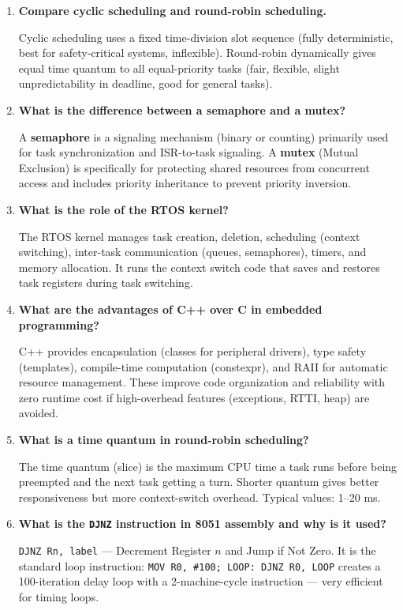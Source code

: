 \documentclass[12pt,a4paper]{article}
\newcommand{\Q}[1]{\textbf{#1}\par\noindent\ignorespaces}
\begin{document}
\begin{tcolorbox}[exambox, title={\textbf{Frequently Asked / Viva Questions}}]
\begin{enumerate}[topsep=0pt, label=\textbf{Q\arabic*.}, itemsep=5pt]
  \item \Q{Compare cyclic scheduling and round-robin scheduling.}
    Cyclic scheduling uses a fixed time-division slot sequence (fully deterministic, best for safety-critical systems, inflexible). Round-robin dynamically gives equal time quantum to all equal-priority tasks (fair, flexible, slight unpredictability in deadline, good for general tasks).
  \item \Q{What is the difference between a semaphore and a mutex?}
    A \textbf{semaphore} is a signaling mechanism (binary or counting) primarily used for task synchronization and ISR-to-task signaling. A \textbf{mutex} (Mutual Exclusion) is specifically for protecting shared resources from concurrent access and includes priority inheritance to prevent priority inversion.
  \item \Q{What is the role of the RTOS kernel?}
    The RTOS kernel manages task creation, deletion, scheduling (context switching), inter-task communication (queues, semaphores), timers, and memory allocation. It runs the context switch code that saves and restores task registers during task switching.
  \item \Q{What are the advantages of C++ over C in embedded programming?}
    C++ provides encapsulation (classes for peripheral drivers), type safety (templates), compile-time computation (constexpr), and RAII for automatic resource management. These improve code organization and reliability with zero runtime cost if high-overhead features (exceptions, RTTI, heap) are avoided.
  \item \Q{What is a time quantum in round-robin scheduling?}
    The time quantum (slice) is the maximum CPU time a task runs before being preempted and the next task getting a turn. Shorter quantum gives better responsiveness but more context-switch overhead. Typical values: 1--20 ms.
  \item \Q{What is the \texttt{DJNZ} instruction in 8051 assembly and why is it used?}
    \texttt{DJNZ Rn, label} --- Decrement Register $n$ and Jump if Not Zero. It is the standard loop instruction: \texttt{MOV R0, \#100; LOOP: DJNZ R0, LOOP} creates a 100-iteration delay loop with a 2-machine-cycle instruction --- very efficient for timing loops.
\end{enumerate}
\end{tcolorbox}
\end{document}
